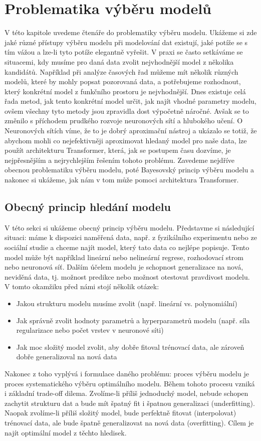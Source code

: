 \chapter{Problematika výběru modelů}

V této kapitole uvedeme čtenáře do problematiky výběru modelu.
Ukážeme si zde jaké různé přístupy výběru modelu při modelování dat existují, jaké potíže se s tím vážou a lze-li tyto potíže elegantně vyřešit. 
V praxi se často setkáváme se situacemi, kdy musíme pro daná data zvolit nejvhodnější model z několika kandidátů.
Například při analýze časových řad můžeme mít několik různých modelů, které by mohly popsat pozorovaná data, a potřebujeme rozhodnout, který konkrétní model z funkčního prostoru je nejvhodnější.    
Dnes existuje celá řada metod, jak tento konkrétní model určit, jak najít vhodné parametry modelu, ovšem všechny tyto metody jsou zpravidla dost výpočetně náročné.
Avšak se to změnilo s příchodem prudkého rozvoje neuronových sítí a hlubokého učení.
O Neuronových sítích víme, že to je dobrý aproximační nástroj a ukázalo se totiž, že abychom mohli co nejefektivněji aproximovat hledaný model pro naše data, lze použít architekturu Transformer, která, jak se postupem času dozvíme, je nejpřesnějším a nejrychlejším řešením tohoto problému.
Zavedeme nejdříve obecnou problematiku výběru modelu, poté Bayesovský princip výběru modelu a nakonec si ukážeme, jak nám v tom může pomoci architektura Transformer.

\section{Obecný princip hledání modelu}
V této sekci si ukážeme obecný princip výběru modelu.
Představme si následující situaci: máme k dispozici naměřená data, např. z fyzikálního experimentu nebo ze sociální studie a chceme najít model, který tato data co nejlépe popisuje.
Tento model může být například lineární nebo nelineární regrese, rozhodovací strom nebo neuronová síť.
Dalším účelem modelu je schopnost generalizace na nová, neviděná data, tj. možnost predikce nebo možnost otestovat pravdivost modelu.
V tomto okamžiku před námi stojí několik otázek: 
\begin{itemize}
  \item Jakou strukturu modelu musíme zvolit (např. lineární vs. polynomiální)
  \item Jak správně zvolit hodnoty parametrů a hyperparametrů modelu (např. síla regularizace nebo počet vrstev v neuronové síti)
  \item Jak moc složitý model zvolit, aby dobře fitoval trénovací data, ale zároveň dobře generalizoval na nová data
\end{itemize}
Nakonec z toho vyplývá i formulace daného problému: proces výběru modelu je proces systematického výběru optimálního modelu.
Během tohoto procesu vzniká i základní trade-off dilema. 
Zvolíme-li příliš jednoduchý model, nebude schopen zachytit strukturu dat a bude mít špatný fit i špatnou generalizaci (underfitting).
Naopak zvolíme-li příliš složitý model, bude perfektně fitovat (interpolovat) trénovací data, ale bude špatně generalizovat na nová data (overfitting).
Cílem je najít optimální model z těchto hledisek.
\par

